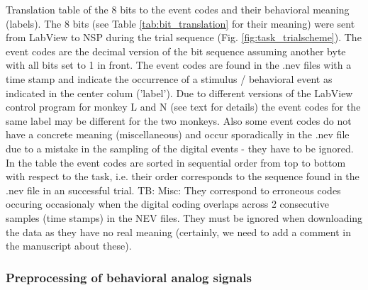 {Translation table of the 8 bits to the event codes and their behavioral meaning (labels). The 8 bits (see Table \cref{tab:bit_translation} for their meaning) were sent from LabView to NSP during the trial sequence (Fig. \cref{fig:task_trialscheme}). The event codes are the decimal version of the bit sequence assuming another byte with all bits set to 1 in front. The event codes are found in the .nev files with a time stamp and indicate the occurrence of a stimulus / behavioral event as indicated in the center colum ('label'). Due to different versions of the LabView control program for monkey L and N (see text for details) the event codes for the same label may be different for the two monkeys. Also some event codes do not have a concrete meaning (miscellaneous) and occur sporadically in the .nev file due to a mistake in the sampling of the digital events - they have to be ignored. In the table the event codes are sorted in sequential order from top to bottom with respect to the task, i.e. their order corresponds to the sequence found in the .nev file in an successful trial. TB: Misc: They correspond to erroneous codes occuring occasionaly when the digital coding overlaps across 2 consecutive samples (time stamps) in the NEV files. They must be ignored when downloading the data as they have no real meaning (certainly, we need to add a comment in the manuscript about these). 

\subsubsection{Preprocessing of behavioral analog signals}

}
